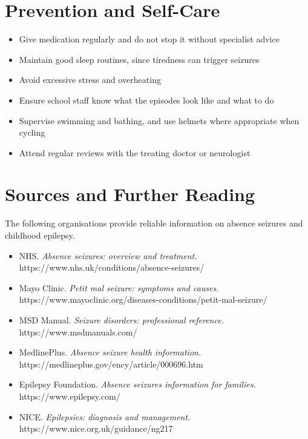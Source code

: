 \section*{Prevention and Self-Care}
\begin{itemize}
    \item Give medication regularly and do not stop it without specialist advice
    \item Maintain good sleep routines, since tiredness can trigger seizures
    \item Avoid excessive stress and overheating
    \item Ensure school staff know what the episodes look like and what to do
    \item Supervise swimming and bathing, and use helmets where appropriate when cycling
    \item Attend regular reviews with the treating doctor or neurologist
\end{itemize}

\section*{Sources and Further Reading}
The following organisations provide reliable information on absence seizures and childhood epilepsy.

\begin{itemize}
    \item NHS. \textit{Absence seizures: overview and treatment.} https://www.nhs.uk/conditions/absence-seizures/
    \item Mayo Clinic. \textit{Petit mal seizure: symptoms and causes.} https://www.mayoclinic.org/diseases-conditions/petit-mal-seizure/
    \item MSD Manual. \textit{Seizure disorders: professional reference.} https://www.msdmanuals.com/
    \item MedlinePlus. \textit{Absence seizure health information.} https://medlineplus.gov/ency/article/000696.htm
    \item Epilepsy Foundation. \textit{Absence seizures information for families.} https://www.epilepsy.com/
    \item NICE. \textit{Epilepsies: diagnosis and management.} https://www.nice.org.uk/guidance/ng217
\end{itemize}
